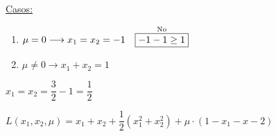 \begin{enumerate}[label=\color{red}\arabic*)]
\begin{enumerate}[label=\color{red}\alph*)]
		\underline{Casos:}
		\begin{enumerate}[label=\arabic*º)]
			\item $\mu=0\longrightarrow x_1=x_2=-1\quad\overset{\text{No}}{\fbox{$-1-1\ge1$}}$
			\item $\mu\neq0\longrightarrow x_1+x_2=1$
		\end{enumerate}
		$x_1=x_2=\dfrac{3}{2}-1=\dfrac{1}{2}$
		
		$L(x_1,x_2,\mu)=x_1+x_2+\dfrac{1}{2}(x_1^2+x_2^2)+\mu\cdot(1-x_1-x-2)$
	\end{enumerate}
\end{enumerate}
